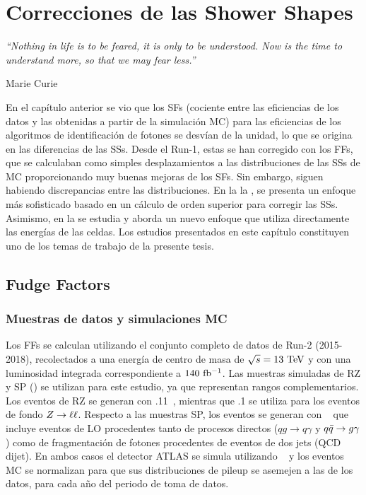 \chapter{Correcciones de las Shower Shapes}
\label{ch:ss_corrections}
\epigraph{\emph{``Nothing in life is to be feared, it is only to be understood. Now is the time to understand more, so that we may fear less.”}}{Marie Curie}


En el capítulo anterior se vio que los \acp{SF} (cociente entre las eficiencias de los datos y las obtenidas a partir de la simulación \ac{MC}) para las eficiencias de los algoritmos de identificación de fotones se desvían de la unidad, lo que se origina en las diferencias de las \acfp{SS}. Desde el Run-1, estas se han corregido con los \acfp{FF}, que se calculaban como simples desplazamientos a las distribuciones de las \acp{SS} de \ac{MC} proporcionando muy buenas mejoras de los \acp{SF}. Sin embargo, siguen habiendo discrepancias entre las distribuciones.
En la la \Sect{\ref{sec:ss_corrections:ffs}}, se presenta un enfoque más sofisticado basado en un cálculo de orden superior para corregir las \acp{SS}. Asimismo, en la \Sect{\ref{sec:ss_corrections:cell_rw}} se estudia y aborda un nuevo enfoque que utiliza directamente las energías de las celdas. Los estudios presentados en este capítulo constituyen uno de los temas de trabajo de la presente tesis.





\section{Fudge Factors}
\label{sec:ss_corrections:ffs}


\subsection{Muestras de datos y simulaciones MC}
\label{subsec:ss_corrections:ffs:samples}

Los \acp{FF} se calculan utilizando el conjunto completo de datos de Run-2 (2015-2018), recolectados a una energía de centro de masa de \(\sqrt{s}=13~\tev\) y con una luminosidad integrada correspondiente a \(140~\ifb\).
Las muestras simuladas de \ac{RZ} y \ac{SP} (\Sect{\ref{subsec:pid_ss:pid:event_selection}}) se utilizan para este estudio, ya que representan rangos \pt complementarios. Los eventos de \ac{RZ} se generan con .11~\cite{Sherpa2.2}, mientras que .1 se utiliza para los eventos de fondo \(\Zboson \to \ell\ell\). Respecto a las muestras \ac{SP}, los eventos se generan con ~\cite{Pythia8.1} que incluye eventos \gammajet de \acf{LO} procedentes tanto de procesos directos (\(qg\to q\gamma\) y \(\qqbar \to g \gamma\)) como de fragmentación de fotones procedentes de eventos de dos jets (\ac{QCD} dijet).
En ambos casos el detector \ac{ATLAS} se simula utilizando \GEANT~\cite{Geant4} y los eventos \ac{MC} se normalizan para que sus distribuciones de pileup se asemejen a las de los datos, para cada año del periodo de toma de datos.


